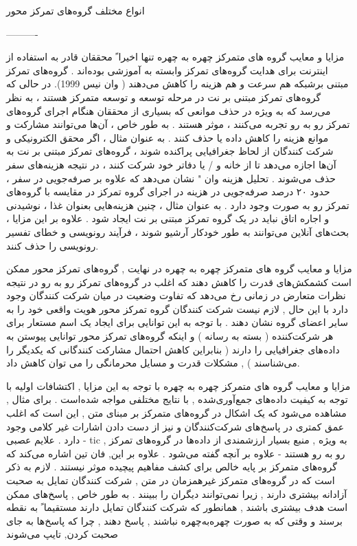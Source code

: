 \documentclass{beamer}
\begin{document}
\begin{persian}
\begin{frame}{انواع مختلف گروه‌های تمرکز محور}
\end{frame}

----------
\begin{frame}{مزایا و معایب گروه های متمرکز چهره به چهره }
تنها اخیرا ً محققان قادر به استفاده از اینترنت برای هدایت گروه‌های تمرکز وابسته به آموزشی بوده‌اند . گروه‌های تمرکز مبتنی برشبکه هم سرعت و هم هزینه را کاهش می‌دهند ( وان نیس 1999). در حالی که گروه‌های تمرکز مبتنی بر نت در مرحله توسعه و توسعه متمرکز هستند ، به نظر می‌رسد که به ویژه در حذف موانعی که بسیاری از محققان هنگام اجرای گروه‌های تمرکز رو به رو تجربه می‌کنند ، موثر هستند . به طور خاص ، آن‌ها می‌توانند مشارکت و موانع هزینه را کاهش داده یا حذف کنند . به عنوان مثال ، اگر محقق الکترونیکی و شرکت کنندگان از لحاظ جغرافیایی پراکنده شوند ، گروه‌های تمرکز مبتنی بر نت به آن‌ها اجازه می‌دهد تا از خانه و / یا دفاتر خود شرکت کنند ، در نتیجه هزینه‌های سفر حذف می‌شوند . تحلیل هزینه وان " نشان می‌دهد که علاوه بر صرفه‌جویی در سفر ، حدود ۲۰ درصد صرفه‌جویی در هزینه در اجرای گروه تمرکز در مقایسه با گروه‌های تمرکز رو به صورت وجود دارد . به عنوان مثال ، چنین هزینه‌هایی بعنوان غذا ، نوشیدنی و اجاره اتاق نباید در یک گروه تمرکز مبتنی بر نت ایجاد شود . علاوه بر این مزایا ، بحث‌های آنلاین می‌توانند به طور خودکار آرشیو شوند ، فرآیند رونویسی و خطای تفسیر رونویسی را حذف کنند. 
\end{frame}

\begin{frame}{مزایا و معایب گروه های متمرکز چهره به چهره }
	در نهایت , گروه‌های تمرکز محور ممکن است کشمکش‌های قدرت را کاهش دهند که اغلب در گروه‌های تمرکز رو به رو در نتیجه نظرات متعارض در زمانی رخ می‌دهد که تفاوت وضعیت در میان شرکت کنندگان وجود دارد با این حال , لازم نیست شرکت کنندگان گروه تمرکز محور هویت واقعی خود را به سایر اعضای گروه نشان دهند . با توجه به این توانایی برای ایجاد یک اسم مستعار برای هر شرکت‌کننده ( بسته به رسانه ) و اینکه گروه‌های تمرکز محور توانایی پیوستن به داده‌های جغرافیایی را دارند ( بنابراین کاهش احتمال مشارکت کنندگانی که یکدیگر را می‌شناسند ) , مشکلات قدرت و مسایل محرمانگی را می ‌توان کاهش داد. 
\end{frame}

\begin{frame}{مزایا و معایب گروه های متمرکز چهره به چهره }
با توجه به این مزایا , اکتشافات اولیه با توجه به کیفیت داده‌های جمع‌آوری‌شده , با نتایج مختلفی مواجه شده‌است . برای مثال , مشاهده می‌شود که یک اشکال در گروه‌های متمرکز بر مبنای متن , این است که اغلب عمق کمتری در پاسخ‌های شرکت‌کنندگان و نیز از دست دادن اشارات غیر کلامی وجود دارد . علایم عصبی - tic , به ویژه , منبع بسیار ارزشمندی از داده‌ها در گروه‌های تمرکز رو به رو هستند - علاوه بر آنچه گفته می‌شود . علاوه بر این, فان تین اشاره می‌کند که گروه‌های متمرکز بر پایه خالص برای کشف مفاهیم پیچیده موثر نیستند . لازم به ذکر است که در گروه‌های متمرکز غیرهمزمان در متن , شرکت کنندگان تمایل به صحبت آزادانه بیشتری دارند , زیرا نمی‌توانند دیگران را ببینند . به طور خاص , پاسخ‌های ممکن است هدف بیشتری باشند , همانطور که شرکت کنندگان تمایل دارند مستقیما ً به نقطه برسند و وقتی که به صورت چهره‌به‌چهره نباشند , پاسخ دهند , چرا که پاسخ‌ها به جای صحبت کردن, تایپ می‌شوند
\end{frame}



\end{persian}
\end{document}
